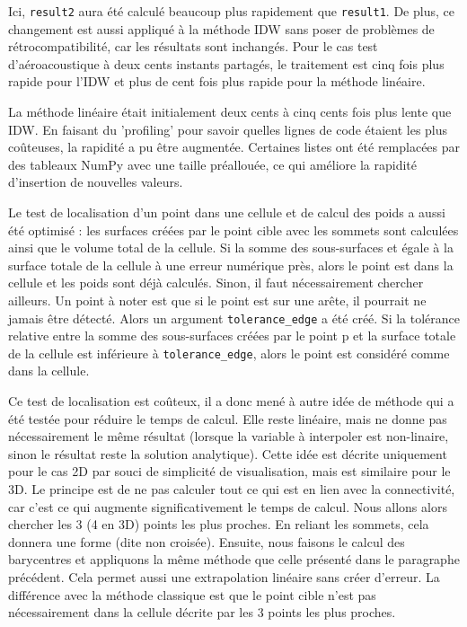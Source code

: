 Ici, \texttt{result2} aura été calculé beaucoup plus rapidement que \texttt{result1}. De plus, ce changement est aussi appliqué à la méthode IDW sans poser de problèmes de rétrocompatibilité, car les résultats sont inchangés. Pour le cas test d'aéroacoustique à deux cents instants partagés, le traitement est cinq fois plus rapide pour l'IDW et plus de cent fois plus rapide pour la méthode linéaire.


La méthode linéaire était initialement deux cents à cinq cents fois plus lente que IDW. En faisant du 'profiling' pour savoir quelles lignes de code étaient les plus coûteuses, la rapidité a pu être augmentée. Certaines listes ont été remplacées par des tableaux NumPy avec une taille préallouée, ce qui améliore la rapidité d'insertion de nouvelles valeurs.

Le test de localisation d'un point dans une cellule et de calcul des poids a aussi été optimisé : les surfaces créées par le point cible avec les sommets sont calculées ainsi que le volume total de la cellule. Si la somme des sous-surfaces et égale à la surface totale de la cellule à une erreur numérique près, alors le point est dans la cellule et les poids sont déjà calculés. Sinon, il faut nécessairement chercher ailleurs. Un point à noter est que si le point est sur une arête, il pourrait ne jamais être détecté. Alors un argument \texttt{tolerance\_edge} a été créé. Si la tolérance relative entre la somme des sous-surfaces créées par le point p et la surface totale de la cellule est inférieure à \texttt{tolerance\_edge}, alors le point est considéré comme dans la cellule. %

Ce test de localisation est coûteux, il a donc mené à autre idée de méthode qui a été testée pour réduire le temps de calcul. Elle reste linéaire, mais ne donne pas nécessairement le même résultat (lorsque la variable à interpoler est non-linaire, sinon le résultat reste la solution analytique). Cette idée est décrite uniquement pour le cas 2D par souci de simplicité de visualisation, mais est similaire pour le 3D.
Le principe est de ne pas calculer tout ce qui est en lien avec la connectivité, car c'est ce qui augmente significativement le temps de calcul.
Nous allons alors chercher les 3 (4 en 3D) points les plus proches. En reliant les sommets, cela donnera une forme (dite non croisée). 
Ensuite, nous faisons le calcul des barycentres et appliquons la même méthode que celle présenté dans le paragraphe précédent. Cela permet aussi une extrapolation linéaire sans créer d'erreur.
La différence avec la méthode classique est que le point cible n'est pas nécessairement dans la cellule décrite par les 3 points les plus proches.


